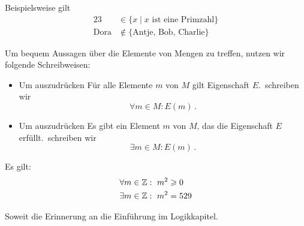 \begin{bsp} Beispielsweise gilt
\begin{align*}
 23 & \in\{ x \mid  x\text{ ist eine Primzahl}\} \\
 \text{Dora} & \notin\{ \text{Antje, Bob, Charlie}\}
\end{align*}
\end{bsp}

\begin{notion}
	Um bequem Aussagen über die Elemente von Mengen zu treffen, nutzen wir folgende Schreibweisen:
	\begin{itemize}
		\item Um auszudrücken \glqq Für alle Elemente $m$ von $M$ gilt Eigenschaft $E$.\grqq\ schreiben wir
			\[ \forall m\in M: E(m) \,. \]
		\item Um auszudrücken \glqq Es gibt ein Element $m$ von $M$, das die Eigenschaft $E$ erfüllt.\grqq\ schreiben wir
			\[ \exists m\in M: E(m) \,. \]
	\end{itemize}	
\end{notion}

\begin{bsp} Es gilt:
\begin{align*}
 \forall m\in {\mathbb Z} &:\ m^2 \geqslant 0 \\
 \exists m\in {\mathbb Z} &:\ m^2=529
\end{align*}
\end{bsp}

Soweit die Erinnerung an die Einführung im Logikkapitel.


